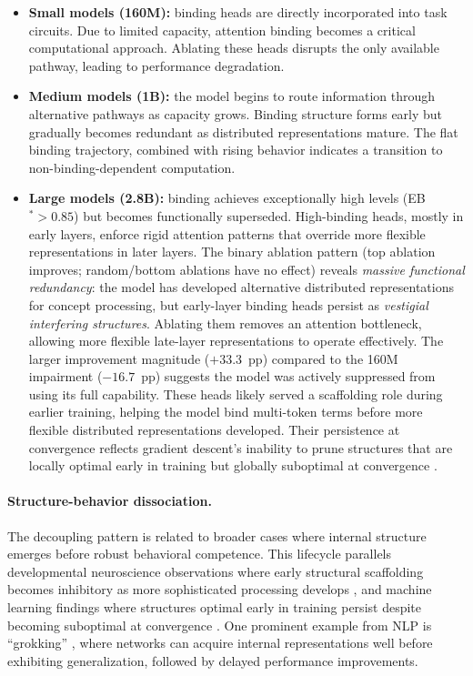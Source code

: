 \documentclass[10pt]{article} %
\begin{document}
\begin{itemize}
  \item \textbf{Small models (160M):} binding heads are directly incorporated into task circuits.
  Due to limited capacity, attention binding becomes a critical computational approach. Ablating these heads disrupts the only available pathway, leading to performance degradation.

  \item \textbf{Medium models (1B):} the model begins to route information through alternative pathways as capacity grows.
  Binding structure forms early but gradually becomes redundant as distributed representations mature.
  The flat binding trajectory, combined with rising behavior indicates a transition to non-binding-dependent computation.

  \item \textbf{Large models (2.8B):} binding achieves exceptionally high levels (EB$^*>0.85$) but becomes functionally superseded.
High-binding heads, mostly in early layers, enforce rigid attention patterns that override more flexible representations in later layers.
The binary ablation pattern (top ablation improves; random/bottom ablations have no effect) reveals \emph{massive functional redundancy}: the model has developed alternative distributed representations for concept processing, but early-layer binding heads persist as \emph{vestigial interfering structures}.
Ablating them removes an attention bottleneck, allowing more flexible late-layer representations to operate effectively.
The larger improvement magnitude ($+33.3$~pp) compared to the 160M impairment ($-16.7$~pp) suggests the model was actively suppressed from using its full capability.
These heads likely served a scaffolding role during earlier training, helping the model bind multi-token terms before more flexible distributed representations developed.
Their persistence at convergence reflects gradient descent's inability to prune structures that are locally optimal early in training but globally suboptimal at convergence \citep{frankle2019lottery}.
\end{itemize}

\paragraph{Structure-behavior dissociation.}
The decoupling pattern is related to broader cases where internal structure emerges before robust behavioral competence.
This lifecycle parallels developmental neuroscience observations where early structural scaffolding becomes inhibitory as more sophisticated processing develops \citep{huttenlocher2002neural}, and machine learning findings where structures optimal early in training persist despite becoming suboptimal at convergence \citep{frankle2019lottery}.
One prominent example from NLP is ``grokking'' \citep{power2022grokking}, where networks can acquire internal representations well before exhibiting generalization, followed by delayed performance improvements.
\end{document}
